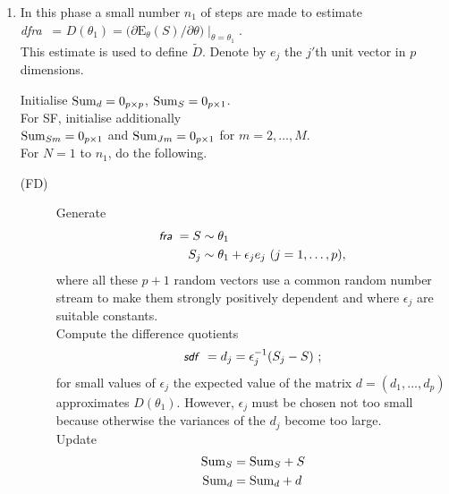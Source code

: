 \documentclass[a4paper,12pt,fleqn]{article}
\newcommand{\E}{\mbox{E}}
\newcommand{\nnm}[1]{\textsf{\small\textit{#1}\ }}
\begin{document}
\begin{enumerate}
\item In this phase a small number $n_1$ of steps are made to estimate\\
      \nnm{dfra} = $D(\theta_1) =
                \big(\partial \E_\theta(S) / \partial \theta\big)
                       \mid_{\theta = \theta_1} $.\\
      This estimate is used to define ${\tilde{D}}$.
      Denote by $e_j$ the $j'$th unit vector in $p$ dimensions.

     Initialise ${{\rm{Sum}}}_{d} = 0_{p \times p}$,
           ${{\rm{Sum}}}_{S} = 0_{p \times 1}$.\\
     For SF, initialise additionally\\
              ${\rm{Sum}}_{Sm} = 0_{p \times 1}$ and
              ${\rm{Sum}}_{Jm} = 0_{p \times 1}$ for $m = 2, \ldots, M$.\\
     For $N = 1$ to $n_1$, do the following.
     \begin{description}
     \item[(FD)] Generate
     \begin{align*}
       \nnm{fra} = S & \sim  \theta_1  \\
        S_{j} & \sim  \theta_1 + \epsilon_j e_j \ (j = 1, \ldots, p),
     \end{align*}
      where all these $p+1$ random vectors
      use a common random number stream to make them strongly positively
      dependent and where $\epsilon_j$ are suitable constants.\\
      Compute the difference quotients
      \[
      \nnm{sdf} = d_{j} = \epsilon_j^{-1} (S_{j} - S)~;
      \]
      for small values of $\epsilon_j$ the expected value of the matrix
      $d = (d_{1}, ..., d_{p})$ approximates $D(\theta_1)$.
      However, $\epsilon_j$ must be chosen not too small because otherwise
      the variances of the $d_{j}$ become too large.\\
      Update
            \begin{align*}
            {\rm{Sum}}_{S}  &= {\rm{Sum}}_{S} + S \\
            {\rm{Sum}}_{d}  &= {\rm{Sum}}_{d} + d \\
            \end{align*}


\end{description}
\end{enumerate}
\end{document}
